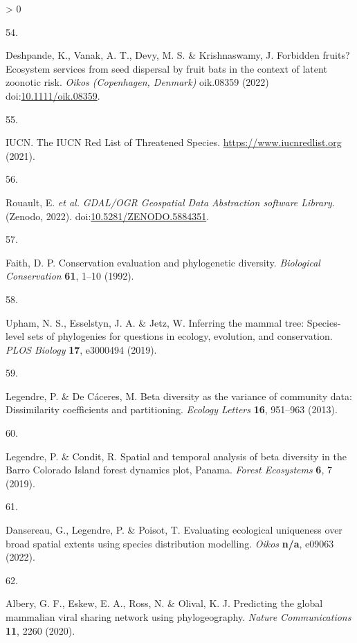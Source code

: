 \documentclass[10pt,oneside]{article}
\newlength{\cslhangindent}
\newlength{\csllabelwidth}
\newenvironment{CSLReferences}[3] %
 {%
  \setlength{\parindent}{0pt}
  \ifodd #1 \everypar{\setlength{\hangindent}{\cslhangindent}}\ignorespaces\fi
  \ifnum #2 > 0
  \setlength{\parskip}{#2\baselineskip}
  \fi
 }%
 {}
\newcommand{\CSLLeftMargin}[1]{\parbox[t]{\maxof{\widthof{#1}}{\csllabelwidth}}{#1}}
\newcommand{\CSLRightInline}[1]{\parbox[t]{\linewidth}{#1}}
\begin{document}
\begin{CSLReferences}{0}{0}
\leavevmode\hypertarget{ref-Deshpande2022ForFru}{}%
\CSLLeftMargin{54. }
\CSLRightInline{Deshpande, K., Vanak, A. T., Devy, M. S. \&
Krishnaswamy, J. Forbidden fruits? Ecosystem services from seed
dispersal by fruit bats in the context of latent zoonotic risk.
\emph{Oikos (Copenhagen, Denmark)} oik.08359 (2022)
doi:\href{https://doi.org/10.1111/oik.08359}{10.1111/oik.08359}.}

\leavevmode\hypertarget{ref-IUCN2021IucRed}{}%
\CSLLeftMargin{55. }
\CSLRightInline{IUCN. The IUCN Red List of Threatened Species.
\url{https://www.iucnredlist.org} (2021).}

\leavevmode\hypertarget{ref-RouaultEven2022GdaOgr}{}%
\CSLLeftMargin{56. }
\CSLRightInline{Rouault, E. \emph{et al.} \emph{GDAL/OGR Geospatial Data
Abstraction software Library}. (Zenodo, 2022).
doi:\href{https://doi.org/10.5281/ZENODO.5884351}{10.5281/ZENODO.5884351}.}

\leavevmode\hypertarget{ref-Faith1992ConEva}{}%
\CSLLeftMargin{57. }
\CSLRightInline{Faith, D. P. Conservation evaluation and phylogenetic
diversity. \emph{Biological Conservation} \textbf{61}, 1--10 (1992).}

\leavevmode\hypertarget{ref-Upham2019InfMam}{}%
\CSLLeftMargin{58. }
\CSLRightInline{Upham, N. S., Esselstyn, J. A. \& Jetz, W. Inferring the
mammal tree: Species-level sets of phylogenies for questions in ecology,
evolution, and conservation. \emph{PLOS Biology} \textbf{17}, e3000494
(2019).}

\leavevmode\hypertarget{ref-Legendre2013BetDiv}{}%
\CSLLeftMargin{59. }
\CSLRightInline{Legendre, P. \& De Cáceres, M. Beta diversity as the
variance of community data: Dissimilarity coefficients and partitioning.
\emph{Ecology Letters} \textbf{16}, 951--963 (2013).}

\leavevmode\hypertarget{ref-Legendre2019SpaTem}{}%
\CSLLeftMargin{60. }
\CSLRightInline{Legendre, P. \& Condit, R. Spatial and temporal analysis
of beta diversity in the Barro Colorado Island forest dynamics plot,
Panama. \emph{Forest Ecosystems} \textbf{6}, 7 (2019).}

\leavevmode\hypertarget{ref-Dansereau2022EvaEco}{}%
\CSLLeftMargin{61. }
\CSLRightInline{Dansereau, G., Legendre, P. \& Poisot, T. Evaluating
ecological uniqueness over broad spatial extents using species
distribution modelling. \emph{Oikos} \textbf{n/a}, e09063 (2022).}

\leavevmode\hypertarget{ref-Albery2020PreGlo}{}%
\CSLLeftMargin{62. }
\CSLRightInline{Albery, G. F., Eskew, E. A., Ross, N. \& Olival, K. J.
Predicting the global mammalian viral sharing network using
phylogeography. \emph{Nature Communications} \textbf{11}, 2260 (2020).}


\end{CSLReferences}
\end{document}
